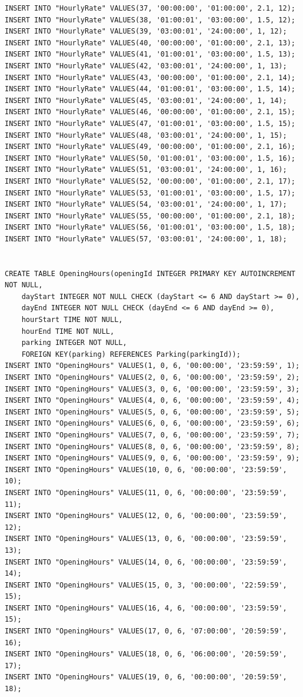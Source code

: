 \documentclass[a4paper,11pt]{article}
\begin{document}
\begin{lstlisting}
INSERT INTO "HourlyRate" VALUES(37, '00:00:00', '01:00:00', 2.1, 12);
INSERT INTO "HourlyRate" VALUES(38, '01:00:01', '03:00:00', 1.5, 12);
INSERT INTO "HourlyRate" VALUES(39, '03:00:01', '24:00:00', 1, 12);
INSERT INTO "HourlyRate" VALUES(40, '00:00:00', '01:00:00', 2.1, 13);
INSERT INTO "HourlyRate" VALUES(41, '01:00:01', '03:00:00', 1.5, 13);
INSERT INTO "HourlyRate" VALUES(42, '03:00:01', '24:00:00', 1, 13);
INSERT INTO "HourlyRate" VALUES(43, '00:00:00', '01:00:00', 2.1, 14);
INSERT INTO "HourlyRate" VALUES(44, '01:00:01', '03:00:00', 1.5, 14);
INSERT INTO "HourlyRate" VALUES(45, '03:00:01', '24:00:00', 1, 14);
INSERT INTO "HourlyRate" VALUES(46, '00:00:00', '01:00:00', 2.1, 15);
INSERT INTO "HourlyRate" VALUES(47, '01:00:01', '03:00:00', 1.5, 15);
INSERT INTO "HourlyRate" VALUES(48, '03:00:01', '24:00:00', 1, 15);
INSERT INTO "HourlyRate" VALUES(49, '00:00:00', '01:00:00', 2.1, 16);
INSERT INTO "HourlyRate" VALUES(50, '01:00:01', '03:00:00', 1.5, 16);
INSERT INTO "HourlyRate" VALUES(51, '03:00:01', '24:00:00', 1, 16);
INSERT INTO "HourlyRate" VALUES(52, '00:00:00', '01:00:00', 2.1, 17);
INSERT INTO "HourlyRate" VALUES(53, '01:00:01', '03:00:00', 1.5, 17);
INSERT INTO "HourlyRate" VALUES(54, '03:00:01', '24:00:00', 1, 17);
INSERT INTO "HourlyRate" VALUES(55, '00:00:00', '01:00:00', 2.1, 18);
INSERT INTO "HourlyRate" VALUES(56, '01:00:01', '03:00:00', 1.5, 18);
INSERT INTO "HourlyRate" VALUES(57, '03:00:01', '24:00:00', 1, 18);


CREATE TABLE OpeningHours(openingId INTEGER PRIMARY KEY AUTOINCREMENT NOT NULL,
	dayStart INTEGER NOT NULL CHECK (dayStart <= 6 AND dayStart >= 0),
	dayEnd INTEGER NOT NULL CHECK (dayEnd <= 6 AND dayEnd >= 0),
	hourStart TIME NOT NULL,
	hourEnd TIME NOT NULL,
	parking INTEGER NOT NULL,
	FOREIGN KEY(parking) REFERENCES Parking(parkingId));
INSERT INTO "OpeningHours" VALUES(1, 0, 6, '00:00:00', '23:59:59', 1);
INSERT INTO "OpeningHours" VALUES(2, 0, 6, '00:00:00', '23:59:59', 2);
INSERT INTO "OpeningHours" VALUES(3, 0, 6, '00:00:00', '23:59:59', 3);
INSERT INTO "OpeningHours" VALUES(4, 0, 6, '00:00:00', '23:59:59', 4);
INSERT INTO "OpeningHours" VALUES(5, 0, 6, '00:00:00', '23:59:59', 5);
INSERT INTO "OpeningHours" VALUES(6, 0, 6, '00:00:00', '23:59:59', 6);
INSERT INTO "OpeningHours" VALUES(7, 0, 6, '00:00:00', '23:59:59', 7);
INSERT INTO "OpeningHours" VALUES(8, 0, 6, '00:00:00', '23:59:59', 8);
INSERT INTO "OpeningHours" VALUES(9, 0, 6, '00:00:00', '23:59:59', 9);
INSERT INTO "OpeningHours" VALUES(10, 0, 6, '00:00:00', '23:59:59', 10);
INSERT INTO "OpeningHours" VALUES(11, 0, 6, '00:00:00', '23:59:59', 11);
INSERT INTO "OpeningHours" VALUES(12, 0, 6, '00:00:00', '23:59:59', 12);
INSERT INTO "OpeningHours" VALUES(13, 0, 6, '00:00:00', '23:59:59', 13);
INSERT INTO "OpeningHours" VALUES(14, 0, 6, '00:00:00', '23:59:59', 14);
INSERT INTO "OpeningHours" VALUES(15, 0, 3, '00:00:00', '22:59:59', 15);
INSERT INTO "OpeningHours" VALUES(16, 4, 6, '00:00:00', '23:59:59', 15);
INSERT INTO "OpeningHours" VALUES(17, 0, 6, '07:00:00', '20:59:59', 16);
INSERT INTO "OpeningHours" VALUES(18, 0, 6, '06:00:00', '20:59:59', 17);
INSERT INTO "OpeningHours" VALUES(19, 0, 6, '00:00:00', '20:59:59', 18);



\end{lstlisting}
\end{document}
